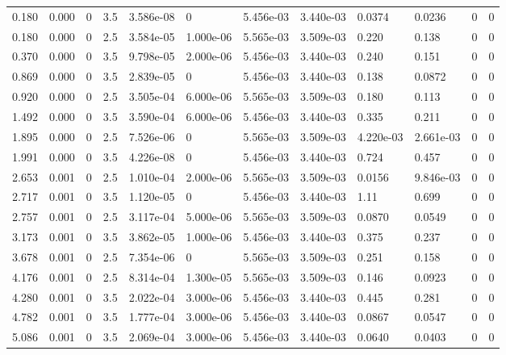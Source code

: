\documentclass[preview]{standalone}
\begin{document}
{{\begin{tabular}{L{1.2cm}C{1.2cm} C{0.3cm}C{0.5cm} C{1.4cm}C{1.4cm} C{1.4cm}C{1.4cm} C{1.6cm}C{1.6cm} C{1.6cm}C{1.6cm}}
  0.180  &  0.000  & 0     & 3.5 &  3.586e-08  & 0  &  5.456e-03&   3.440e-03& 0.0374 & 0.0236   &  0 & 0  \\ 
  0.180  &  0.000  & 0     & 2.5 &  3.584e-05  & 1.000e-06  &  5.565e-03&   3.509e-03& 0.220 & 0.138   &  0 & 0  \\ 
  0.370  &  0.000  & 0     & 3.5 &  9.798e-05  & 2.000e-06  &  5.456e-03&   3.440e-03& 0.240 & 0.151   &  0 & 0  \\ 
  0.869  &  0.000  & 0     & 3.5 &  2.839e-05  & 0  &  5.456e-03&   3.440e-03& 0.138 & 0.0872   &  0 & 0  \\ 
  0.920  &  0.000  & 0     & 2.5 &  3.505e-04  & 6.000e-06  &  5.565e-03&   3.509e-03& 0.180 & 0.113   &  0 & 0  \\ 
  1.492  &  0.000  & 0     & 3.5 &  3.590e-04  & 6.000e-06  &  5.456e-03&   3.440e-03& 0.335 & 0.211   &  0 & 0  \\ 
  1.895  &  0.000  & 0     & 2.5 &  7.526e-06  & 0  &  5.565e-03&   3.509e-03& 4.220e-03 & 2.661e-03   &  0 & 0  \\ 
  1.991  &  0.000  & 0     & 3.5 &  4.226e-08  & 0  &  5.456e-03&   3.440e-03& 0.724 & 0.457   &  0 & 0  \\ 
  2.653  &  0.001  & 0     & 2.5 &  1.010e-04  & 2.000e-06  &  5.565e-03&   3.509e-03& 0.0156 & 9.846e-03   &  0 & 0  \\ 
  2.717  &  0.001  & 0     & 3.5 &  1.120e-05  & 0  &  5.456e-03&   3.440e-03& 1.11 & 0.699   &  0 & 0  \\ 
  2.757  &  0.001  & 0     & 2.5 &  3.117e-04  & 5.000e-06  &  5.565e-03&   3.509e-03& 0.0870 & 0.0549   &  0 & 0  \\ 
  3.173  &  0.001  & 0     & 3.5 &  3.862e-05  & 1.000e-06  &  5.456e-03&   3.440e-03& 0.375 & 0.237   &  0 & 0  \\ 
  3.678  &  0.001  & 0     & 2.5 &  7.354e-06  & 0  &  5.565e-03&   3.509e-03& 0.251 & 0.158   &  0 & 0  \\ 
  4.176  &  0.001  & 0     & 2.5 &  8.314e-04  & 1.300e-05  &  5.565e-03&   3.509e-03& 0.146 & 0.0923   &  0 & 0  \\ 
  4.280  &  0.001  & 0     & 3.5 &  2.022e-04  & 3.000e-06  &  5.456e-03&   3.440e-03& 0.445 & 0.281   &  0 & 0  \\ 
  4.782  &  0.001  & 0     & 3.5 &  1.777e-04  & 3.000e-06  &  5.456e-03&   3.440e-03& 0.0867 & 0.0547   &  0 & 0  \\ 
  5.086  &  0.001  & 0     & 3.5 &  2.069e-04  & 3.000e-06  &  5.456e-03&   3.440e-03& 0.0640 & 0.0403   &  0 & 0  \\ 

\end{tabular}}}
\end{document}
